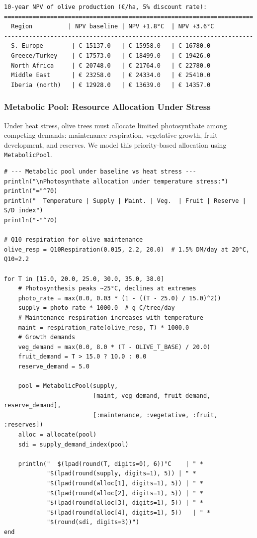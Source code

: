 \begin{verbatim}
10-year NPV of olive production (€/ha, 5% discount rate):
======================================================================
  Region          | NPV baseline | NPV +1.8°C  | NPV +3.6°C  
----------------------------------------------------------------------
  S. Europe        | € 15137.0   | € 15958.0   | € 16780.0
  Greece/Turkey    | € 17573.0   | € 18499.0   | € 19426.0
  North Africa     | € 20748.0   | € 21764.0   | € 22780.0
  Middle East      | € 23258.0   | € 24334.0   | € 25410.0
  Iberia (north)   | € 12928.0   | € 13639.0   | € 14357.0
\end{verbatim}



\subsubsection{Metabolic Pool: Resource Allocation Under Stress}



\label{6583834480000394416}{}


Under heat stress, olive trees must allocate limited photosynthate among competing demands: maintenance respiration, vegetative growth, fruit development, and reserves. We model this priority-based allocation using \texttt{MetabolicPool}.




\begin{verbatim}
# --- Metabolic pool under baseline vs heat stress ---
println("\nPhotosynthate allocation under temperature stress:")
println("="^70)
println("  Temperature | Supply | Maint. | Veg.  | Fruit | Reserve | S/D index")
println("-"^70)

# Q10 respiration for olive maintenance
olive_resp = Q10Respiration(0.015, 2.2, 20.0)  # 1.5% DM/day at 20°C, Q10=2.2

for T in [15.0, 20.0, 25.0, 30.0, 35.0, 38.0]
    # Photosynthesis peaks ~25°C, declines at extremes
    photo_rate = max(0.0, 0.03 * (1 - ((T - 25.0) / 15.0)^2))
    supply = photo_rate * 1000.0  # g C/tree/day
    # Maintenance respiration increases with temperature
    maint = respiration_rate(olive_resp, T) * 1000.0
    # Growth demands
    veg_demand = max(0.0, 8.0 * (T - OLIVE_T_BASE) / 20.0)
    fruit_demand = T > 15.0 ? 10.0 : 0.0
    reserve_demand = 5.0

    pool = MetabolicPool(supply,
                         [maint, veg_demand, fruit_demand, reserve_demand],
                         [:maintenance, :vegetative, :fruit, :reserves])
    alloc = allocate(pool)
    sdi = supply_demand_index(pool)

    println("  $(lpad(round(T, digits=0), 6))°C    | " *
            "$(lpad(round(supply, digits=1), 5)) | " *
            "$(lpad(round(alloc[1], digits=1), 5)) | " *
            "$(lpad(round(alloc[2], digits=1), 5)) | " *
            "$(lpad(round(alloc[3], digits=1), 5)) | " *
            "$(lpad(round(alloc[4], digits=1), 5))   | " *
            "$(round(sdi, digits=3))")
end
\end{verbatim}




